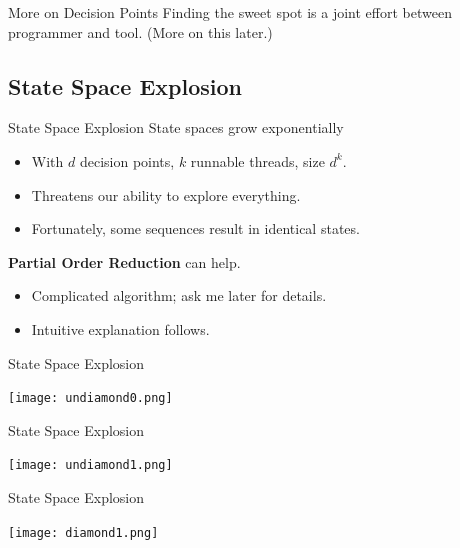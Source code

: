 \documentclass[xcolor=dvipsnames]{beamer}
\begin{document}
{\begin{frame}{More on Decision Points}
	Finding the sweet spot is a joint effort between programmer and tool. (More on this later.)
\end{frame}


\subsection{State Space Explosion}

\begin{frame}{State Space Explosion}
	State spaces grow exponentially
	\begin{itemize}
		\item With $d$ decision points, $k$ runnable threads, size $d^k$.
		\item Threatens our ability to explore everything.
		\item Fortunately, some sequences result in identical states.
	\end{itemize}
	\linegap

	{\bf Partial Order Reduction} can help.
	\begin{itemize}
		\item Complicated algorithm; ask me later for details.
		\item Intuitive explanation follows.
	\end{itemize}
\end{frame}

\begin{frame}{State Space Explosion}
	\begin{center}
	\texttt{[image: undiamond0.png]}
	\end{center}
\end{frame}
\begin{frame}{State Space Explosion}
	\begin{center}
	\texttt{[image: undiamond1.png]}
	\end{center}
\end{frame}
\begin{frame}{State Space Explosion}
	\begin{center}
	\texttt{[image: diamond1.png]}
	\end{center}
\end{frame}


}
\end{document}
